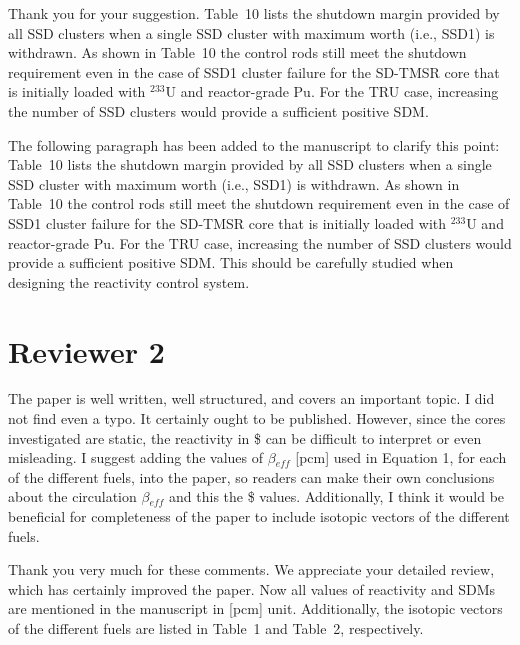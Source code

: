 \documentclass[answers,11pt]{exam}
\begin{document}
\begin{questions}
\begin{solution}
	Thank you for your suggestion. Table~10 lists the shutdown margin provided by all SSD clusters when a single SSD cluster with maximum worth (i.e., SSD1) is withdrawn. As shown in Table~10 the control rods still meet the shutdown requirement even in the case of SSD1 cluster failure for the SD-TMSR core that is initially loaded with $^{233}$U and reactor-grade Pu. For the TRU case, increasing the number of SSD clusters would provide a sufficient positive SDM.
	
		The following paragraph has been added to the manuscript to clarify this point:\\
	
	Table~10 lists the shutdown margin provided by all SSD clusters when a single SSD cluster with maximum worth (i.e., SSD1) is withdrawn. As shown in Table~10 the control rods still meet the shutdown requirement even in the case of SSD1 cluster failure for the SD-TMSR core that is initially loaded with $^{233}$U and reactor-grade Pu. For the TRU case, increasing the number of SSD clusters would provide a sufficient positive SDM. This should be carefully studied when designing the reactivity control system. 
	
	
\end{solution}

        \section*{Reviewer 2}

        \question The paper is well written, well structured, and covers an important topic. I did not find even a typo. It certainly ought to be published. However, since the cores investigated are static, the reactivity in \$ can be difficult to interpret or even misleading. I suggest adding the values of $\beta$$_{eff}$ [pcm] used in Equation 1, for each of the different fuels, into the paper, so readers can make their own conclusions about the circulation $\beta$$_{eff}$ and this the \$ values. Additionally, I think it would be beneficial for completeness of the paper to include isotopic vectors of the different fuels.
        
        \begin{solution}
        Thank you very much for these comments. We appreciate your detailed review, which has certainly improved the paper. Now all values of reactivity and SDMs are mentioned in the manuscript in [pcm] unit. Additionally, the isotopic vectors of the different fuels are listed in Table~1 and Table~2, respectively.
        

\end{solution}
\end{questions}
\end{document}
